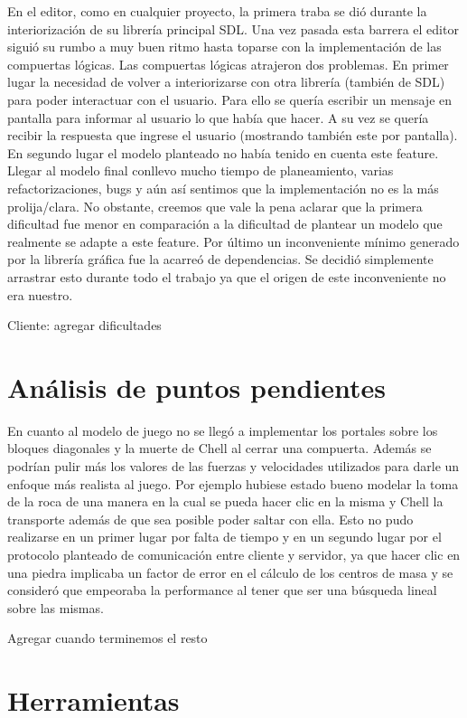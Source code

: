 \documentclass[a4paper]{article}
\begin{document}
En el editor, como en cualquier proyecto, la primera traba se dió durante la interiorización de su librería principal SDL. Una vez pasada esta barrera el editor siguió su rumbo a muy buen ritmo hasta toparse con la implementación de las compuertas lógicas.
Las compuertas lógicas atrajeron dos problemas. En primer lugar la necesidad de volver a interiorizarse con otra librería (también de SDL) para poder interactuar con el usuario. Para ello se quería escribir un mensaje en pantalla para informar al usuario lo que había que hacer. A su vez se quería recibir la respuesta que ingrese el usuario (mostrando también este por pantalla).  En segundo lugar el modelo planteado no había tenido en cuenta este feature. Llegar al modelo final conllevo mucho tiempo de planeamiento, varias refactorizaciones, bugs y aún así sentimos que la implementación no es la más prolija/clara. No obstante, creemos que vale la pena aclarar que la primera dificultad fue menor en comparación a la dificultad de plantear un modelo que realmente se adapte a este feature.
Por último un inconveniente mínimo generado por la librería gráfica fue la acarreó de dependencias. Se decidió simplemente arrastrar esto durante todo el trabajo ya que el origen de este inconveniente no era nuestro.


Cliente: agregar dificultades

\section{Análisis de puntos pendientes}

En cuanto al modelo de juego no se llegó a implementar los portales sobre los bloques diagonales y la muerte de Chell al cerrar una compuerta. Además se podrían pulir más los valores de las fuerzas y velocidades utilizados para darle un enfoque más realista al juego. Por ejemplo hubiese estado bueno modelar la toma de la roca de una manera en la cual se pueda hacer clic en la misma y Chell la transporte además de que sea posible poder saltar con ella. Esto no pudo realizarse en un primer lugar por falta de tiempo y en un segundo lugar por el protocolo planteado de comunicación entre cliente y servidor, ya que hacer clic en una piedra implicaba un factor de error en el cálculo de los centros de masa y se consideró que empeoraba la performance al tener que ser una búsqueda lineal sobre las mismas. 

Agregar cuando terminemos el resto

\section{Herramientas}
\end{document}
